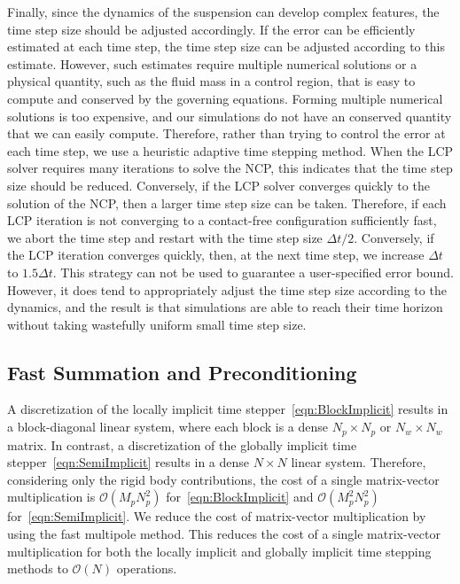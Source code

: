 \documentclass[AMA,STIX1COL]{WileyNJD-v2}
\begin{document}
Finally, since the dynamics of the suspension can develop complex
features, the time step size should be adjusted accordingly.  If the
error can be efficiently estimated at each time step, the time step size
can be adjusted according to this estimate.  However, such estimates
require multiple numerical solutions or a physical quantity, such as the
fluid mass in a control region, that is easy to compute and conserved by
the governing equations.  Forming multiple numerical solutions is too
expensive, and our simulations do not have an conserved quantity that we
can easily compute.  Therefore, rather than trying to control the error
at each time step, we use a heuristic adaptive time stepping method.
When the LCP solver requires many iterations to solve the NCP, this
indicates that the time step size should be reduced.  Conversely, if the
LCP solver converges quickly to the solution of the NCP, then a larger
time step size can be taken.  Therefore, if each LCP iteration is not
converging to a contact-free configuration sufficiently fast, we abort
the time step and restart with the time step size $\Delta t/2$.
Conversely, if the LCP iteration converges quickly, then, at the next
time step, we increase $\Delta t$ to $1.5\Delta t$. This strategy can
not be used to guarantee a user-specified error bound.  However, it does
tend to appropriately adjust the time step size according to the
dynamics, and the result is that simulations are able to reach their
time horizon without taking wastefully uniform small time step size.

\subsection{Fast Summation and Preconditioning}
\label{sec:fast}
A discretization of the locally implicit time
stepper~\eqref{eqn:BlockImplicit} results in a block-diagonal linear
system, where each block is a dense $N_p \times N_p$ or $N_w \times N_w$
matrix.  In contrast, a discretization of the globally implicit time
stepper~\eqref{eqn:SemiImplicit} results in a dense $N \times N$ linear
system.  Therefore, considering only the rigid body contributions, the
cost of a single matrix-vector multiplication is $\mathcal{O}(M_p
N_p^2)$ for~\eqref{eqn:BlockImplicit} and $\mathcal{O}(M_p^2 N_p^2)$
for~\eqref{eqn:SemiImplicit}.  We reduce the cost of matrix-vector
multiplication by using the fast multipole method.  This reduces the
cost of a single matrix-vector multiplication for both the locally
implicit and globally implicit time stepping methods to $\mathcal{O}(N)$
operations.
\end{document}

